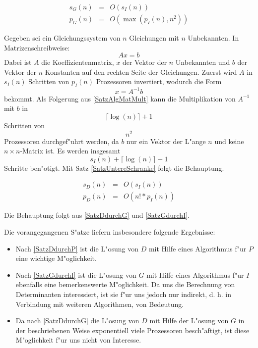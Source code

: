 \begin{satz}
\label{SatzGdurchI}
    \begin{eqnarray*}
        s_G(n) & = & O(s_I(n))
    \\  p_G(n) & = & O(\max(p_I(n),n^2))
    \end{eqnarray*}
\end{satz}
\begin{beweis}
    Gegeben sei ein Gleichungssystem von $n$ Gleichungen mit $n$
    Unbekannten. In Matrizenschreibweise:
    \begin{equation}
    \label{EquNGleiNUnbek}
        Ax=b
    \end{equation}
    Dabei ist
    $A$ die Koeffizientenmatrix, $x$ der Vektor
    der $n$ Unbekannten und
    $b$ der Vektor der $n$ Konstanten auf den rechten Seite der
    Gleichungen.
    Zuerst wird $A$ in $s_I(n)$ Schritten von $p_I(n)$ Prozessoren
    invertiert, wodurch  die Form
    \[ x=A^{-1}b \] bekommt. Als Folgerung aus \ref{SatzAlgMatMult}
    kann die Multiplikation von $A^{-1}$ mit $b$ in
    \[ \lceil \log(n) \rceil + 1 \] Schritten von \[ n^2 \] Prozessoren
    durchgef"uhrt werden, da $b$ nur ein Vektor der L"ange $n$ und keine
    $n \times n$-Matrix ist. Es werden insgesamt
    \[ s_I(n) + \lceil \log(n) \rceil + 1 \] Schritte ben"otigt. Mit
    Satz \ref{SatzUntereSchranke} folgt die Behauptung.
\end{beweis}

\begin{korollar}
\label{SatzDdurchI}
 
    \begin{eqnarray*}
        s_D(n) & = & O(s_I(n))
    \\  p_D(n) & = & O(n! * p_I(n))
    \end{eqnarray*}
\end{korollar}
\begin{beweis}
    Die Behauptung folgt aus \ref{SatzDdurchG} und \ref{SatzGdurchI}.
\end{beweis}

Die vorangegangenen S"atze liefern insbesondere folgende Ergebnisse:
\begin{itemize}
\item
      Nach \ref{SatzDdurchP} ist die L"osung von $D$ mit Hilfe eines
      Algorithmus f"ur $P$ eine wichtige M"oglichkeit.
\item
      Nach \ref{SatzGdurchI} ist die L"osung von $G$ mit Hilfe eines
      Algorithmus f"ur $I$ ebenfalls eine bemerkenswerte M"oglichkeit.
      Da uns die Berechnung von Determinanten interessiert, ist sie
      f"ur uns jedoch nur indirekt, d. h. in Verbindung mit weiteren
      Algorithmen, von Bedeutung.
\item
      Da nach \ref{SatzDdurchG} die L"osung von $D$ mit Hilfe der L"osung
      von $G$ in der beschriebenen Weise exponentiell viele Prozessoren
      besch"aftigt, ist diese M"oglichkeit f"ur uns nicht von Interesse.
\end{itemize}

